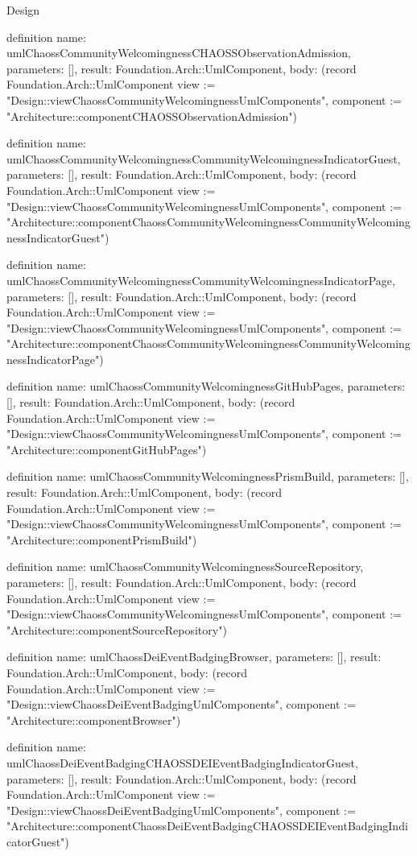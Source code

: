 \begin{lexlean}{Design}
\begin{semanticmodule}
definition{
  name: umlChaossCommunityWelcomingnessCHAOSSObservationAdmission,
  parameters: [],
  result: Foundation.Arch::UmlComponent,
  body: (record Foundation.Arch::UmlComponent {view := "Design::viewChaossCommunityWelcomingnessUmlComponents", component := "Architecture::componentCHAOSSObservationAdmission"})
}

definition{
  name: umlChaossCommunityWelcomingnessCommunityWelcomingnessIndicatorGuest,
  parameters: [],
  result: Foundation.Arch::UmlComponent,
  body: (record Foundation.Arch::UmlComponent {view := "Design::viewChaossCommunityWelcomingnessUmlComponents", component := "Architecture::componentChaossCommunityWelcomingnessCommunityWelcomingnessIndicatorGuest"})
}

definition{
  name: umlChaossCommunityWelcomingnessCommunityWelcomingnessIndicatorPage,
  parameters: [],
  result: Foundation.Arch::UmlComponent,
  body: (record Foundation.Arch::UmlComponent {view := "Design::viewChaossCommunityWelcomingnessUmlComponents", component := "Architecture::componentChaossCommunityWelcomingnessCommunityWelcomingnessIndicatorPage"})
}

definition{
  name: umlChaossCommunityWelcomingnessGitHubPages,
  parameters: [],
  result: Foundation.Arch::UmlComponent,
  body: (record Foundation.Arch::UmlComponent {view := "Design::viewChaossCommunityWelcomingnessUmlComponents", component := "Architecture::componentGitHubPages"})
}

definition{
  name: umlChaossCommunityWelcomingnessPrismBuild,
  parameters: [],
  result: Foundation.Arch::UmlComponent,
  body: (record Foundation.Arch::UmlComponent {view := "Design::viewChaossCommunityWelcomingnessUmlComponents", component := "Architecture::componentPrismBuild"})
}

definition{
  name: umlChaossCommunityWelcomingnessSourceRepository,
  parameters: [],
  result: Foundation.Arch::UmlComponent,
  body: (record Foundation.Arch::UmlComponent {view := "Design::viewChaossCommunityWelcomingnessUmlComponents", component := "Architecture::componentSourceRepository"})
}

definition{
  name: umlChaossDeiEventBadgingBrowser,
  parameters: [],
  result: Foundation.Arch::UmlComponent,
  body: (record Foundation.Arch::UmlComponent {view := "Design::viewChaossDeiEventBadgingUmlComponents", component := "Architecture::componentBrowser"})
}

definition{
  name: umlChaossDeiEventBadgingCHAOSSDEIEventBadgingIndicatorGuest,
  parameters: [],
  result: Foundation.Arch::UmlComponent,
  body: (record Foundation.Arch::UmlComponent {view := "Design::viewChaossDeiEventBadgingUmlComponents", component := "Architecture::componentChaossDeiEventBadgingCHAOSSDEIEventBadgingIndicatorGuest"})
}


\end{semanticmodule}
\end{lexlean}
